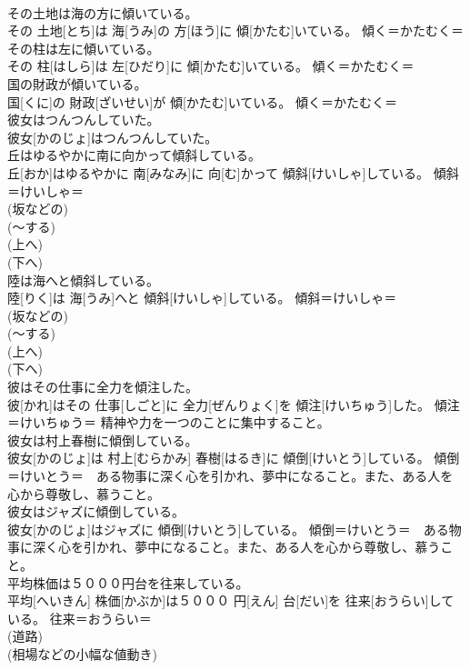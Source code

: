\documentclass[8pt]{extreport}
\begin{document}
\begin{CJK}{UTF8}{min}
{\\	その土地は海の方に傾いている。	
\\	その 土地[とち]は 海[うみ]の 方[ほう]に 傾[かたむ]いている。	傾く＝かたむく＝ 
\\	その柱は左に傾いている。	
\\	その 柱[はしら]は 左[ひだり]に 傾[かたむ]いている。	傾く＝かたむく＝ 
\\	国の財政が傾いている。	
\\	国[くに]の 財政[ざいせい]が 傾[かたむ]いている。	傾く＝かたむく＝ 
\\	彼女はつんつんしていた。	
\\	彼女[かのじょ]はつんつんしていた。	
\\	丘はゆるやかに南に向かって傾斜している。	
\\	丘[おか]はゆるやかに 南[みなみ]に 向[む]かって 傾斜[けいしゃ]している。	傾斜＝けいしゃ＝ 
\\	(坂などの) 
\\	(〜する) 
\\	(上へ) 
\\	(下へ) 
\\	陸は海へと傾斜している。	
\\	陸[りく]は 海[うみ]へと 傾斜[けいしゃ]している。	傾斜＝けいしゃ＝ 
\\	(坂などの) 
\\	(〜する) 
\\	(上へ) 
\\	(下へ) 
\\	彼はその仕事に全力を傾注した。	
\\	彼[かれ]はその 仕事[しごと]に 全力[ぜんりょく]を 傾注[けいちゅう]した。	傾注＝けいちゅう＝ 精神や力を一つのことに集中すること。
\\	彼女は村上春樹に傾倒している。	
\\	彼女[かのじょ]は 村上[むらかみ] 春樹[はるき]に 傾倒[けいとう]している。	傾倒＝けいとう＝　ある物事に深く心を引かれ、夢中になること。また、ある人を心から尊敬し、慕うこと。
\\	彼女はジャズに傾倒している。	
\\	彼女[かのじょ]はジャズに 傾倒[けいとう]している。	傾倒＝けいとう＝　ある物事に深く心を引かれ、夢中になること。また、ある人を心から尊敬し、慕うこと。
\\	平均株価は５０００円台を往来している。	
\\	平均[へいきん] 株価[かぶか]は５０００ 円[えん] 台[だい]を 往来[おうらい]している。	往来＝おうらい＝ 
\\	(道路) 
\\	(相場などの小幅な値動き) 
}
\end{CJK}
\end{document}

